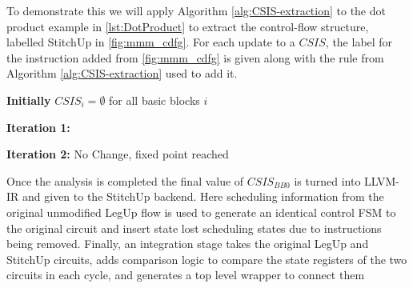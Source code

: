 To demonstrate this we will apply Algorithm \ref{alg:CSIS-extraction} to the
dot product example in \ref{lst:DotProduct} to extract the control-flow structure, 
labelled StitchUp in \ref{fig:mmm_cdfg}. 
For each update to a $\mathit{CSIS}$, the label for the instruction added from \ref{fig:mmm_cdfg} is given 
along with the rule from Algorithm \ref{alg:CSIS-extraction} used to add it. 

\vspace{1mm}
\noindent
\textbf{Initially} $\mathit{CSIS}_{i} = \emptyset$ for all basic blocks $i$

\vspace{-2mm}
\noindent
\hrulefill

\vspace{-1mm}
\noindent
\textbf{Iteration 1:}


\vspace{1mm}
\noindent
\textbf{Iteration 2:}\hspace{3mm} No Change, fixed point reached

\vspace{1mm}

Once the analysis is completed the final value of $\mathit{CSIS}_{\mathit{BB0}}$ is turned into LLVM-IR
and given to the StitchUp backend.
Here scheduling information from the original unmodified LegUp flow is used to generate
an identical control FSM to the original circuit and insert state lost scheduling states
due to instructions being removed. 
Finally, an integration stage takes the original LegUp and StitchUp circuits,
adds comparison logic to compare the state registers of the two circuits in each cycle,
and generates a top level wrapper to connect them
